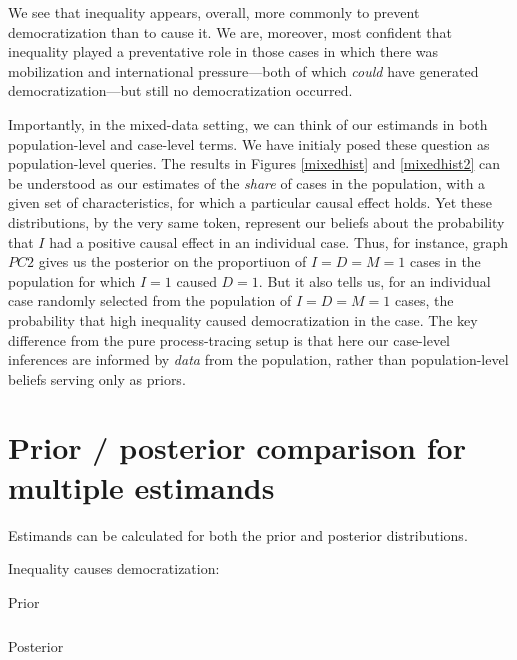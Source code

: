 \documentclass[12pt,]{book}
\begin{document}
We see that inequality appears, overall, more commonly to prevent democratization than to cause it. We are, moreover, most confident that inequality played a preventative role in those cases in which there was mobilization and international pressure---both of which \emph{could} have generated democratization---but still no democratization occurred.

Importantly, in the mixed-data setting, we can think of our estimands in both population-level and case-level terms. We have initialy posed these question as population-level queries. The results in Figures \ref{mixedhist} and \ref{mixedhist2} can be understood as our estimates of the \emph{share} of cases in the population, with a given set of characteristics, for which a particular causal effect holds. Yet these distributions, by the very same token, represent our beliefs about the probability that \(I\) had a positive causal effect in an individual case. Thus, for instance, graph \(PC2\) gives us the posterior on the proportiuon of \(I=D=M=1\) cases in the population for which \(I=1\) caused \(D=1\). But it also tells us, for an individual case randomly selected from the population of \(I=D=M=1\) cases, the probability that high inequality caused democratization in the case. The key difference from the pure process-tracing setup is that here our case-level inferences are informed by \emph{data} from the population, rather than population-level beliefs serving only as priors.

\hypertarget{prior-posterior-comparison-for-multiple-estimands}{%
\section{Prior / posterior comparison for multiple estimands}\label{prior-posterior-comparison-for-multiple-estimands}}

Estimands can be calculated for both the prior and posterior distributions.

Inequality causes democratization:

\begin{table}[t]

\caption{\label{tab:IcausesDem}Prior}
\centering
\begin{tabular}{}
\hline

\hline
\end{tabular}
\end{table}

\begin{table}[t]

\caption{\label{tab:IcausesDem}Posterior}
\centering
\begin{tabular}{}
\hline

\hline
\end{tabular}
\end{table}
\end{document}
